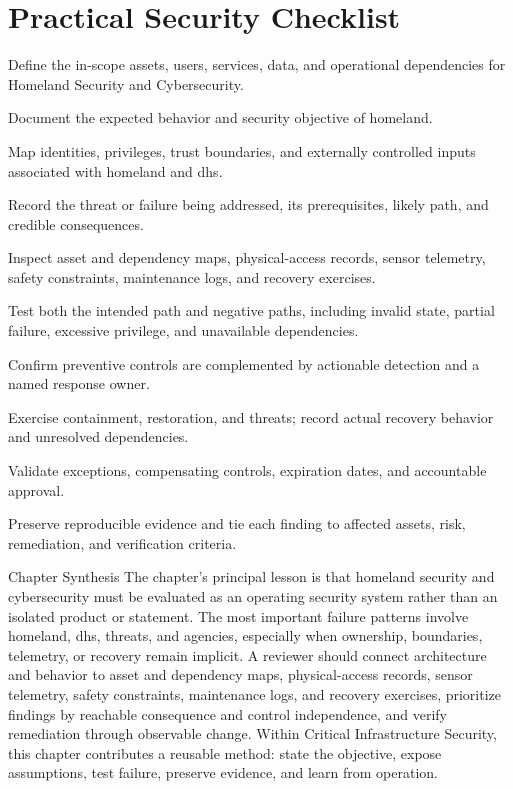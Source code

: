 \documentclass[11pt,letterpaper]{article}
\begin{document}
\section*{Practical Security Checklist}
\begin{CornellChecklist}
\item Define the in-scope assets, users, services, data, and operational dependencies for Homeland Security and Cybersecurity.
\item Document the expected behavior and security objective of homeland.
\item Map identities, privileges, trust boundaries, and externally controlled inputs associated with homeland and dhs.
\item Record the threat or failure being addressed, its prerequisites, likely path, and credible consequences.
\item Inspect asset and dependency maps, physical-access records, sensor telemetry, safety constraints, maintenance logs, and recovery exercises.
\item Test both the intended path and negative paths, including invalid state, partial failure, excessive privilege, and unavailable dependencies.
\item Confirm preventive controls are complemented by actionable detection and a named response owner.
\item Exercise containment, restoration, and threats; record actual recovery behavior and unresolved dependencies.
\item Validate exceptions, compensating controls, expiration dates, and accountable approval.
\item Preserve reproducible evidence and tie each finding to affected assets, risk, remediation, and verification criteria.
\end{CornellChecklist}
\begin{CornellSummaryBox}{Chapter Synthesis}
The chapter's principal lesson is that homeland security and cybersecurity must be evaluated as an operating security system rather than an isolated product or statement. The most important failure patterns involve homeland, dhs, threats, and agencies, especially when ownership, boundaries, telemetry, or recovery remain implicit. A reviewer should connect architecture and behavior to asset and dependency maps, physical-access records, sensor telemetry, safety constraints, maintenance logs, and recovery exercises, prioritize findings by reachable consequence and control independence, and verify remediation through observable change. Within Critical Infrastructure Security, this chapter contributes a reusable method: state the objective, expose assumptions, test failure, preserve evidence, and learn from operation.
\end{CornellSummaryBox}
\end{document}
